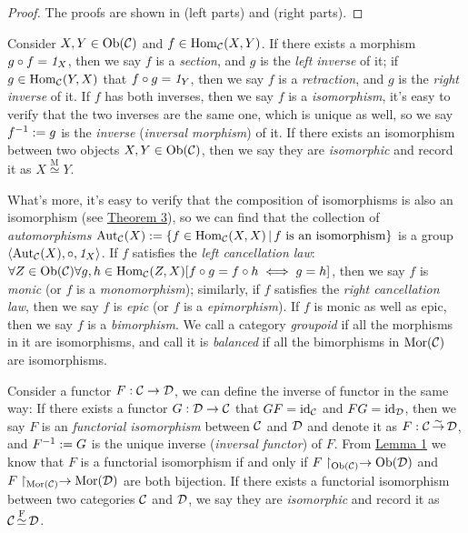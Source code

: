 \documentclass{article}
\begin{document}
\begin{proof}
	The proofs are shown in \cite[Theorem 3J]{set-2} (left parts) and \cite[(\S2.1) Proposition 2.2 \& Example 2.3]{cat-1} (right parts).
\end{proof}


\begin{defi}\label{inverse}
	Consider $X,Y\in\mathrm{Ob}(\mathcal{C})$ and $f\in\mathrm{Hom}_{\mathcal{C}}(X,Y)$. If there exists a morphism $g\circ f=\mathit{1}_X$, then we say $f$ is a \emph{section}, and $g$ is the \emph{left inverse} of it; if $g\in\mathrm{Hom}_{\mathcal{C}}(Y,X)$ that $f\circ g=\mathit{1}_Y$, then we say $f$ is a \emph{retraction}, and $g$ is the \emph{right inverse} of it. If $f$ has both inverses, then we say $f$ is a \emph{isomorphism}, it's easy to verify that the two inverses  are the same one, which is unique as well, so we say $f^{-1}:=g$ is the \emph{inverse} (\emph{inversal morphism}) of it. If there exists an isomorphism between two objects $X,Y\in\mathrm{Ob}(\mathcal{C})$, then we say they are \emph{isomorphic} and record it as $X\mathop{\simeq}\limits^\mathrm{M}Y$.
	
	What's more, it's easy to verify that the composition of isomorphisms is also an isomorphism (see \hyperref[transitivity]{Theorem 3}), so we can find that the collection of \emph{automorphisms} $\mathrm{Aut}_\ca(X):=\{f\in\Hom_\ca(X,X)\,|\,f\ \text{is an isomorphism}\}$ is a group $\left<\mathrm{Aut}_{\mathcal{C}}(X),\circ,\mathit{1}_X\right>$. If $f$ satisfies the \emph{left cancellation law}: $\forall Z\in\mathrm{Ob}(\mathcal{C})\forall g,h\in\mathrm{Hom}_{\mathcal{C}}(Z,X)[f\circ g=f\circ h\iff g=h]$, then we say $f$ is \emph{monic} (or $f$ is a \emph{monomorphism}); similarly, if $f$ satisfies the \emph{right cancellation law}, then we say $f$ is \emph{epic} (or $f$ is a \emph{epimorphism}). If $f$ is monic as well as epic, then we say $f$ is a \emph{bimorphism}. We call a category \emph{groupoid} if all the morphisms in it are isomorphisms, and call it is \emph{balanced} if all the bimorphisms in $\mathrm{Mor}(\mathcal{C})$ are isomorphisms.
	
	Consider a functor $F:\mathcal{C}\to\mathcal{D}$, we can define the inverse of functor in the same way: If there exists a functor $G:\mathcal{D}\to\mathcal{C}$ that $GF=\mathrm{id}_{\mathcal{C}}$ and $FG=\mathrm{id}_{\mathcal{D}}$, then we say $F$ is an \emph{functorial isomorphism} between $\mathcal{C}$ and $\mathcal{D}$ and denote it as $F:\mathcal{C}\mathop{\to}\limits^{\sim}\mathcal{D}$, and $F^{-1}:=G$ is the unique inverse (\emph{inversal functor}) of $F$. From \hyperref[map]{Lemma 1} we know that $F$ is a functorial isomorphism if and only if $F\upharpoonright_{\mathrm{Ob}(\mathcal{C})}\to\mathrm{Ob}(\mathcal{D})$ and $F\upharpoonright_{\mathrm{Mor}(\mathcal{C})}\to\mathrm{Mor}(\mathcal{D})$ are both bijection. If there exists a functorial isomorphism between two categories $\mathcal{C}$ and $\mathcal{D}$, we say they are \emph{isomorphic} and record it as $\mathcal{C}\mathop{\simeq}\limits^\mathrm{F}\mathcal{D}$.
	

\end{defi}
\end{document}
